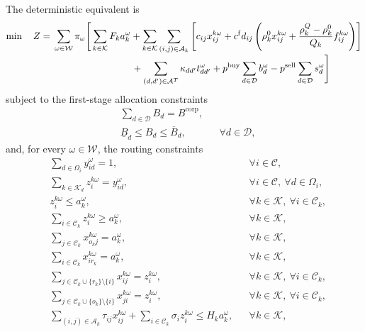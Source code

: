\documentclass[authoryear,final,3p,times]{elsarticle}
\theoremstyle{definition}
\theoremstyle{plain}
\begin{document}
The deterministic equivalent is
\begin{align}
\min\quad Z={}&
\sum_{\omega\in\mathcal W}\pi_\omega\Bigg[
\sum_{k\in\mathcal K}F_k a_k^\omega
+\sum_{k\in\mathcal K}\sum_{(i,j)\in\mathcal A_k}
 \left[c_{ij}x_{ij}^{k\omega}
 +c^{\mathrm{f}}d_{ij}\left(\rho_k^0x_{ij}^{k\omega}
 +\frac{\rho_k^Q-\rho_k^0}{Q_k}f_{ij}^{k\omega}\right)\right]
\notag\\[-1mm]
&\hspace{29mm}
+\sum_{(d,d')\in\mathcal A^T}\kappa_{dd'}t_{dd'}^\omega
+p^{\mathrm{buy}}\sum_{d\in\mathcal D}b_d^\omega
-p^{\mathrm{sell}}\sum_{d\in\mathcal D}s_d^\omega
\Bigg]
\label{eq:obj}
\end{align}
subject to the first-stage allocation constraints
\begin{align}
&\sum_{d\in\mathcal D}B_d=B^{\mathrm{corp}},
\label{eq:budget_total}\\
&\underline B_d\le B_d\le\overline B_d,
&&\forall d\in\mathcal D,
\label{eq:budget_bounds}
\end{align}
and, for every $\omega\in\mathcal W$, the routing constraints
\begin{align}
&\sum_{d\in\Omega_i}y_{id}^\omega=1,
&&\forall i\in\mathcal C,
\label{eq:c1}\\
&\sum_{k\in\mathcal K_d}z_i^{k\omega}=y_{id}^\omega,
&&\forall i\in\mathcal C,\ \forall d\in\Omega_i,
\label{eq:c2}\\
&z_i^{k\omega}\le a_k^\omega,
&&\forall k\in\mathcal K,\ \forall i\in\mathcal C_k,
\label{eq:c3}\\
&\sum_{i\in\mathcal C_k}z_i^{k\omega}\ge a_k^\omega,
&&\forall k\in\mathcal K,
\label{eq:c4}\\
&\sum_{j\in\mathcal C_k}x_{o_kj}^{k\omega}=a_k^\omega,
&&\forall k\in\mathcal K,
\label{eq:c5}\\
&\sum_{i\in\mathcal C_k}x_{ir_k}^{k\omega}=a_k^\omega,
&&\forall k\in\mathcal K,
\label{eq:c6}\\
&\sum_{j\in\mathcal C_k\cup\{r_k\}\setminus\{i\}}
 x_{ij}^{k\omega}=z_i^{k\omega},
&&\forall k\in\mathcal K,\ \forall i\in\mathcal C_k,
\label{eq:c7}\\
&\sum_{j\in\mathcal C_k\cup\{o_k\}\setminus\{i\}}
 x_{ji}^{k\omega}=z_i^{k\omega},
&&\forall k\in\mathcal K,\ \forall i\in\mathcal C_k,
\label{eq:c78}\\
&\sum_{(i,j)\in\mathcal A_k}\tau_{ij}x_{ij}^{k\omega}
 +\sum_{i\in\mathcal C_k}\sigma_i z_i^{k\omega}
 \le H_k a_k^\omega,
&&\forall k\in\mathcal K,
\label{eq:c12}
\end{align}
\end{document}
